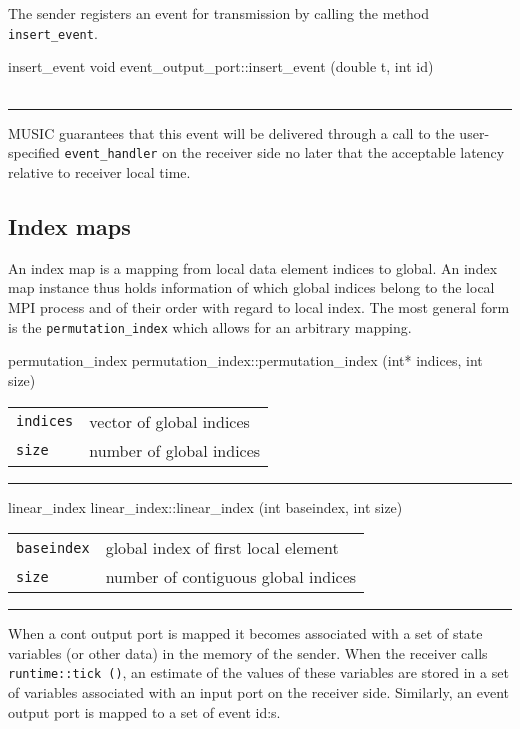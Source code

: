 \documentclass[a4paper]{report}
\makeatletter
\newenvironment{parameters}%
{\begin{tabular}{@{\hspace{2em}}lp{0.6\textwidth}}}%
{\end{tabular}\par\vspace{1mm}\par\hrule\par\vspace{5mm}}
\makeatother
\begin{document}
The sender registers an event for transmission by calling the method
\lstinline|insert_event|.

\begin{head}{insert_event}
  void event_output_port::insert_event (double t, int id)
\end{head}
\begin{parameters}
\end{parameters}

MUSIC guarantees that this event will be delivered through a call to
the user-specified \lstinline|event_handler| on the receiver side no
later that the acceptable latency relative to receiver local time.

\subsection{Index maps}

An index map is a mapping from local data element indices to
global. An index map instance thus holds information of which global
indices belong to the local MPI process and of their order with regard
to local index.  The most general form is the
\lstinline|permutation_index| which allows for an arbitrary mapping.

\begin{head}{permutation_index}
  permutation_index::permutation_index (int* indices,
                                        int size)
\end{head}
\begin{parameters}
  \lstinline|indices| & vector of global indices \\
  \lstinline|size| & number of global indices \\
\end{parameters}

\begin{head}{linear_index}
  linear_index::linear_index (int baseindex, int size)
\end{head}
\begin{parameters}
  \lstinline|baseindex| & global index of first local element \\
  \lstinline|size| & number of contiguous global indices \\
\end{parameters}

When a cont output port is mapped it becomes associated with a set of
state variables (or other data) in the memory of the sender.  When the
receiver calls \lstinline|runtime::tick ()|, an estimate of the values
of these variables are stored in a set of variables associated with an
input port on the receiver side.  Similarly, an event output port is
mapped to a set of event id:s.
\end{document}
